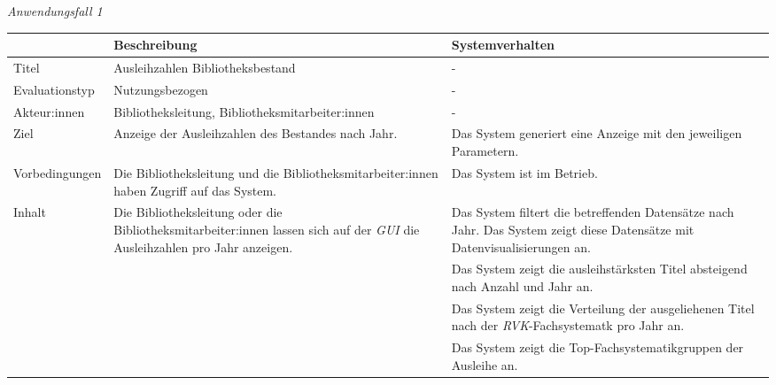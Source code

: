 \noindent
\textit{Anwendungsfall 1}
\begingroup
\setlength{\tabcolsep}{10pt} %
\renewcommand{\arraystretch}{1.15} 
\begin{table}[h]
    \centering
    \begin{adjustbox}{max width=\textwidth}
    \begin{tabular}{lp{7.5cm}p{7.5cm}}
       \toprule
       \textbf{}          & \textbf{Beschreibung} &\textbf{Systemverhalten}\\
       \midrule
        Titel                            &Ausleihzahlen Bibliotheksbestand  & -\\
        Evaluationstyp                   &Nutzungsbezogen                   & -\\
        Akteur:innen                     &Bibliotheksleitung, Bibliotheksmitarbeiter:innen & -\\
        Ziel                             &Anzeige der Ausleihzahlen des Bestandes nach Jahr. & Das System generiert eine Anzeige mit den jeweiligen Parametern.\\
        Vorbedingungen                   &Die Bibliotheksleitung und die Bibliotheksmitarbeiter:innen haben Zugriff auf das System. & Das System ist im Betrieb.\\
        Inhalt                           &Die Bibliotheksleitung oder die Bibliotheksmitarbeiter:innen lassen sich auf der \textit{\acrshort{GUI}} die Ausleihzahlen pro Jahr anzeigen. & Das System filtert die betreffenden Datensätze nach Jahr. Das System zeigt diese Datensätze mit Datenvisualisierungen an.\\
                                         & &Das System zeigt die ausleihstärksten Titel absteigend nach Anzahl und Jahr an.\\
                                         & &Das System zeigt die Verteilung der ausgeliehenen Titel nach der \textit{\acrshort{RVK}}-Fachsystematk pro Jahr an.\\
                                         & &Das System zeigt die Top-Fachsystematikgruppen der Ausleihe an.\\

\end{tabular}
\end{adjustbox}
\end{table}
